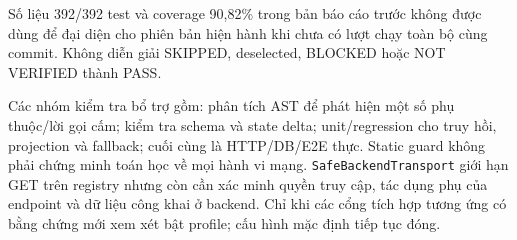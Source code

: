Số liệu 392/392 test và coverage 90,82\% trong bản báo cáo trước không được dùng để đại diện cho phiên bản hiện hành khi chưa có lượt chạy toàn bộ cùng commit. Không diễn giải SKIPPED, deselected, BLOCKED hoặc NOT VERIFIED thành PASS.

Các nhóm kiểm tra bổ trợ gồm: phân tích AST để phát hiện một số phụ thuộc/lời gọi cấm; kiểm tra schema và state delta; unit/regression cho truy hồi, projection và fallback; cuối cùng là HTTP/DB/E2E thực. Static guard không phải chứng minh toán học về mọi hành vi mạng. \texttt{SafeBackendTransport} giới hạn GET trên registry nhưng còn cần xác minh quyền truy cập, tác dụng phụ của endpoint và dữ liệu công khai ở backend. Chỉ khi các cổng tích hợp tương ứng có bằng chứng mới xem xét bật profile; cấu hình mặc định tiếp tục đóng.
